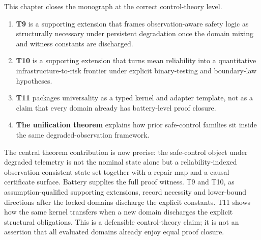 This chapter closes the monograph at the correct control-theory level.

\begin{enumerate}
  \item \textbf{T9} is a supporting extension that frames observation-aware
    safety logic as structurally necessary under persistent degradation once
    the domain mixing and witness constants are discharged.
  \item \textbf{T10} is a supporting extension that turns mean reliability
    into a quantitative infrastructure-to-risk frontier under explicit
    binary-testing and boundary-law hypotheses.
  \item \textbf{T11} packages universality as a typed kernel and adapter
    template, not as a claim that every domain already has battery-level proof
    closure.
  \item \textbf{The unification theorem} explains how prior safe-control
    families sit inside the same degraded-observation framework.
\end{enumerate}

The central theorem contribution is now precise: the safe-control object under
degraded telemetry is not the nominal state alone but a reliability-indexed
observation-consistent state set together with a repair map and a causal
certificate surface.  Battery supplies the full proof witness.  T9 and T10,
as assumption-qualified supporting extensions, record necessity and lower-bound
directions after the locked domains discharge the explicit constants.  T11
shows how the same kernel transfers when a new domain discharges the explicit
structural obligations.  This is a defensible control-theory claim; it is not
an assertion that all evaluated domains already enjoy equal proof closure.
